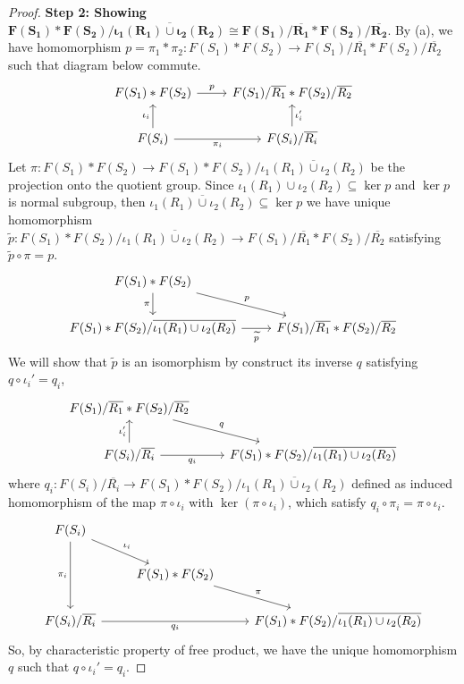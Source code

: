 \documentclass[a4paper]{article}
\theoremstyle{remark}
\newcommand{\subhim}{\subseteq} %
\begin{document}
\begin{proof}
	\textbf{Step 2: Showing $\mathbf{F(S_1) * F(S_2)/\overline{\iota_1(R_1)\cup \iota_2(R_2)} \cong F(S_1)/\overline{R_1} * F(S_2)/\overline{R_2}}$}. By (a), we have homomorphism $p=\pi_1 * \pi_2 : F(S_1)* F(S_2) \to F(S_1)/\overline{R_1} * F(S_2)/\overline{R_2}$ such that diagram below commute.
	\[
	\begin{tikzcd}
	 F(S_1)* F(S_2) \arrow[r,"p"] & F(S_1)/\overline{R_1} * F(S_2)/\overline{R_2} \\
	F(S_i) \arrow[u,"\iota_i"] \arrow[r,"\pi_i",swap] &F(S_i)/\overline{R_i} \arrow[u,"\iota_i'",swap]
	\end{tikzcd}
	\]
	Let $\pi : F(S_1)*F(S_2) \to F(S_1)*F(S_2)/\overline{\iota_1(R_1)\cup \iota_2(R_2)}$ be the projection onto the quotient group. Since $\iota_1(R_1) \cup \iota_2(R_2) \subhim \ker p$ and $\ker p$ is normal subgroup, then $\overline{\iota_1(R_1) \cup \iota_2(R_2)} \subhim \ker p$ we have unique homomorphism $\widetilde{p} : F(S_1)*F(S_2)/\overline{\iota_1(R_1)\cup \iota_2(R_2)} \to F(S_1)/\overline{R_1} * F(S_2)/\overline{R_2}$ satisfying $\widetilde{p} \circ \pi = p$.
	\[
	\begin{tikzcd}
	F(S_1)*F(S_2) \arrow[dr,"p"] \arrow[d,"\pi",swap]& \\
	F(S_1)*F(S_2)/\overline{\iota_1(R_1)\cup \iota_2(R_2)}  \arrow[r,"\widetilde{p}",swap] &  F(S_1)/\overline{R_1} * F(S_2)/\overline{R_2}
	\end{tikzcd}
	\]
	We will show that $\widetilde{p}$ is an isomorphism by construct its inverse $q$ satisfying $q \circ \iota_i' = q_i$,
	\[
	\begin{tikzcd}
	 F(S_1)/\overline{R_1} * F(S_2)/\overline{R_2} \arrow[dr,"q"] & \\
	F(S_i)/\overline{R_i} \arrow[u,"\iota_i'"] \arrow[r,"q_i",swap]& F(S_1)*F(S_2)/\overline{\iota_1(R_1)\cup \iota_2(R_2)} 
	\end{tikzcd}
	\]
	where $q_i : F(S_i)/\overline{R_i} \to F(S_1)*F(S_2)/\overline{\iota_1(R_1)\cup \iota_2(R_2)}$ defined as induced homomorphism of the map $\pi \circ \iota_i$ with $\ker (\pi \circ \iota_i)$, which satisfy $q_i \circ \pi_i = \pi \circ \iota_i$.
	\[
	\begin{tikzcd}
	F(S_i) \arrow[dd,"\pi_i",swap] \arrow[dr,"\iota_i"] & & \\
	& F(S_1) * F(S_2) \arrow[dr,"\pi"] & \\
	F(S_i)/\overline{R_i} \arrow[rr,"q_i",swap] & & F(S_1)*F(S_2)/\overline{\iota_1(R_1)\cup \iota_2(R_2)}
	\end{tikzcd}
	\]
	So, by characteristic property of free product, we have the unique homomorphism $q$ such that $q \circ \iota_i' = q_i$.

\end{proof}
\end{document}
